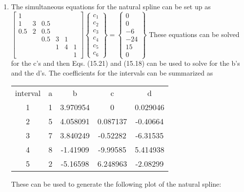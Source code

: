 \documentclass[../main.tex]{subfiles}
\begin{document}
\chapter{}
\label{cha:cha_15}

\section{}
\begin{enumerate}[label=\bfseries(\alph*)]
\item The simultaneous equations for the natural spline can be set up as
	\bigbreak
$
\left[\begin{array}{cccccc}
1 & & & & & \\
1 & 3 & 0.5 & & & \\
0.5 & 2 & 0.5 & & \\
& & 0.5 & 3 & 1 & \\
& & & 1 & 4 & 1 \\
& & & & & 1
\end{array}\right]\left\{\begin{array}{l}
c_{1} \\
c_{2} \\
c_{3} \\
c_{4} \\
c_{5} \\
c_{6}
\end{array}\right\}=\left\{\begin{array}{c}
0 \\
0 \\
-6 \\
-24 \\
15 \\
0
\end{array}\right\}
$
	\bigbreak
These equations can be solved for the c’s and then Eqs. (15.21) and (15.18) can be used to
solve for the b’s and the d’s. The coefficients for the intervals can be summarized as 
	\bigbreak
\begin{tabular}{ccccc}
interval&a&b&c&d\\
1&1&3.970954&0&0.029046\\
2&5&4.058091&0.087137&-0.40664\\
3&7&3.840249&-0.52282&-6.31535\\
4&8&-1.41909&-9.99585&5.414938\\
5&2&-5.16598&6.248963&-2.08299
\end{tabular}
	\bigbreak
These can be used to generate the following plot of the natural spline:
	\bigbreak
	\begin{figure}[H]

\end{figure}
\end{enumerate}
\end{document}
